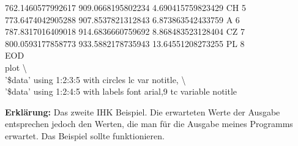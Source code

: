 \documentclass[a4paper,11pt]{article}
\begin{document}
{\begin{mdframed}[linewidth=0pt, backgroundcolor=background, innertopmargin=10pt, innerbottommargin=10pt]
		762.1460577992617 909.0668195802234 4.690415759823429 CH 5\\
		773.6474042905288 907.8537821312843 6.873863542433759 A 6\\
		787.8317016409018 914.6836660759692 8.868483523128404 CZ 7\\
		800.0593177858773 933.5882178735943 13.64551208273255 PL 8\\
		EOD																	\\
		plot \textbackslash 												\\
	'\$data' using 1:2:3:5 with circles lc var notitle, \textbackslash 	\\
	'\$data' using 1:2:4:5 with labels font \grqq{}arial,9\grqq{} tc variable notitle
\end{mdframed}
\vspace{5mm}
\textbf{Erkl\"arung:}
Das zweite IHK Beispiel. Die erwarteten Werte der Ausgabe entsprechen jedoch den Werten, die man f\"ur die Ausgabe meines Programms erwartet.
Das Beispiel sollte funktionieren.\\

}
\end{document}
